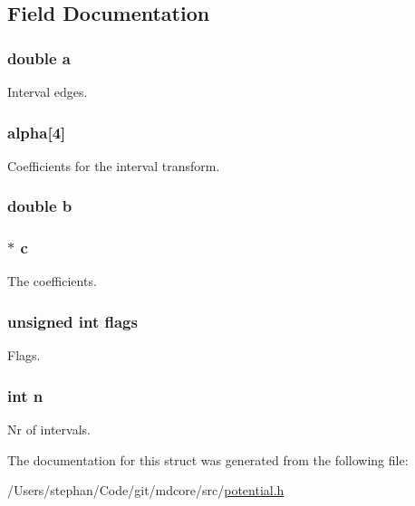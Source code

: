 \subsection{Field Documentation}
\hypertarget{structpotential_a1031d0e0a97a340abfe0a6ab9e831045}{
\subsubsection[{a}]{\setlength{\rightskip}{0pt plus 5cm}double a}}\label{structpotential_a1031d0e0a97a340abfe0a6ab9e831045}
Interval edges. \hypertarget{structpotential_a90cc93057627c97aeea54021b8758532}{
\subsubsection[{alpha}]{ alpha\mbox{[}4\mbox{]}}}\label{structpotential_a90cc93057627c97aeea54021b8758532}
Coefficients for the interval transform. \hypertarget{structpotential_a1510a66dacf9cf3586de5fc89ae2a073}{
\subsubsection[{b}]{\setlength{\rightskip}{0pt plus 5cm}double b}}\label{structpotential_a1510a66dacf9cf3586de5fc89ae2a073}
\hypertarget{structpotential_a30fc290af674fbe78d5ea515353d4ec2}{
\subsubsection[{c}]{$\ast$ c}}\label{structpotential_a30fc290af674fbe78d5ea515353d4ec2}
The coefficients. \hypertarget{structpotential_ac92588540e8c1d014a08cd8a45462b19}{
\subsubsection[{flags}]{\setlength{\rightskip}{0pt plus 5cm}unsigned int flags}}\label{structpotential_ac92588540e8c1d014a08cd8a45462b19}
Flags. \hypertarget{structpotential_a76f11d9a0a47b94f72c2d0e77fb32240}{
\subsubsection[{n}]{\setlength{\rightskip}{0pt plus 5cm}int n}}\label{structpotential_a76f11d9a0a47b94f72c2d0e77fb32240}
Nr of intervals. 

The documentation for this struct was generated from the following file\-:\begin{DoxyCompactItemize}
\item 
/\-Users/stephan/\-Code/git/mdcore/src/\hyperlink{potential_8h}{potential.\-h}\end{DoxyCompactItemize}
